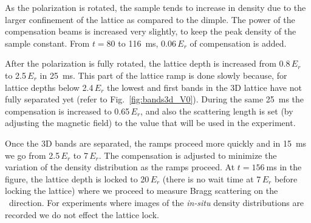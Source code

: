 As the polarization is rotated, the sample tends to increase in density due to
the larger confinement of the lattice as compared to the dimple.  The power of
the compensation beams is increased very slightly, to keep the peak density of
the sample constant. From $t=80$ to 116~ms, 0.06\,$E_{r}$ of compensation is
added. 

After the polarization is fully rotated,  the lattice depth is increased from
0.8$\,E_{r}$ to 2.5\,$E_{r}$ in 25~ms.  This part of the lattice ramp is done
slowly  because, for lattice depths below 2.4\,$E_{r}$ the lowest and first
bands in the 3D lattice have not fully separated yet (refer to
Fig.~\ref{fig:bands3d_V0}).  During the same 25~ms the compensation is
increased to 0.65\,$E_{r}$, and also the scattering length is set (by adjusting
the magnetic field) to the value that will be used in the experiment.  

Once the 3D bands are separated, the ramps proceed more quickly and in 15~ms we
go from 2.5\,$E_{r}$ to 7\,$E_{r}$.  The compensation is adjusted to minimize
the variation of the density distribution as the ramps proceed.   At $t=156~$ms
in the figure, the lattice depth is locked to 20$\,E_{r}$ (there is no wait
time at 7\,$E_{r}$ before locking the lattice) where we proceed to measure
Bragg scattering on the \hhh\ direction.   For experiments where images of the
\textit{in-situ} density distributions are recorded we do not effect the
lattice lock.  



